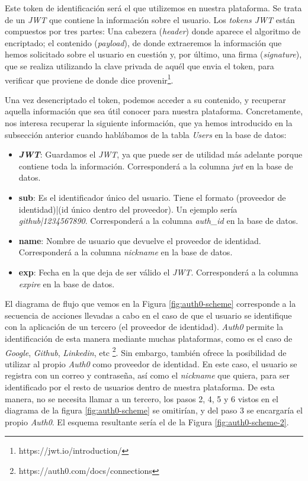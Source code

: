 \documentclass[11pt,spanish,listoffigures]{tfgetsinf}
\begin{document}
Este token de identificación será el que utilizemos en nuestra plataforma. Se trata de un \textit{JWT} que contiene la información sobre el usuario. Los \textit{tokens JWT} están compuestos por tres partes: Una cabezera (\textit{header}) donde aparece el algoritmo de encriptado; el contenido (\textit{payload}), de donde extraeremos la información que hemos solicitado sobre el usuario en cuestión y, por último, una firma (\textit{signature}), que se realiza utilizando la clave privada de aquél que envia el token, para verificar que proviene de donde dice provenir\footnote{https://jwt.io/introduction/}.

Una vez desencriptado el token, podemos acceder a su contenido, y recuperar aquella información que sea útil conocer para nuestra plataforma. Concretamente, nos interesa recuperar la siguiente información, que ya hemos introducido en la subsección anterior cuando hablábamos de la tabla \textit{Users} en la base de datos:

\begin{itemize}

\item \textbf{\textit{JWT}}: Guardamos el \textit{JWT}, ya que puede ser de utilidad más adelante porque contiene toda la información. Corresponderá a la columna \textit{jwt} en la base de datos.

\item \textbf{sub}: Es el identificador único del usuario. Tiene el formato (proveedor de identidad)|(id único dentro del proveedor). Un ejemplo sería \textit{github|1234567890}. Corresponderá a la columna \textit{auth\_id} en la base de datos.

\item \textbf{name}: Nombre de usuario que devuelve el proveedor de identidad. Corresponderá a la columna \textit{nickname} en la base de datos.

\item \textbf{exp}: Fecha en la que deja de ser válido el \textit{JWT}. Corresponderá a la columna \textit{expire} en la base de datos.

\end{itemize}

El diagrama de flujo que vemos en la Figura \ref{fig:auth0-scheme} corresponde a la secuencia de acciones llevadas a cabo en el caso de que el usuario se identifique con la aplicación de un tercero (el proveedor de identidad). \textit{Auth0} permite la identificación de esta manera mediante muchas plataformas, como es el caso de \textit{Google}, \textit{Github}, \textit{Linkedin}, etc \footnote{https://auth0.com/docs/connections}. Sin embargo, también ofrece la posibilidad de utilizar al propio \textit{Auth0} como proveedor de identidad. En este caso, el usuario se registra con un correo y contraseña, así como el \textit{nickname} que quiera, para ser identificado por el resto de usuarios dentro de nuestra plataforma. De esta manera, no se necesita llamar a un tercero, los pasos 2, 4, 5 y 6 vistos en el diagrama de la figura \ref{fig:auth0-scheme} se omitirían, y del paso 3 se encargaría el propio \textit{Auth0}. El esquema resultante sería el de la Figura \ref{fig:auth0-scheme-2}.  
\end{document}
